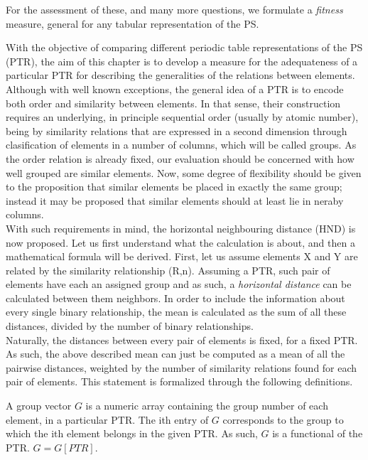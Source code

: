 \documentclass[article]{article}
\begin{document}
For the assessment of these, and many more questions, we formulate a \textit{fitness} measure, general for any tabular representation of the PS.



With the objective of comparing different periodic table representations of the PS (PTR), the aim of this chapter is to develop a measure for the adequateness of a particular PTR for describing the generalities of the relations between elements. \\

Although with well known exceptions, the general idea of a PTR is to encode both order and similarity between elements. In that sense, their construction requires an underlying, in principle sequential order (usually by atomic number), being  by similarity relations that are expressed in a second dimension through clasification of elements in a number of columns, which will be called groups. As the order relation is already fixed, our evaluation should be concerned with how well grouped are similar elements. Now, some degree of flexibility should be given to the proposition that similar elements be placed in exactly the same group; instead it may be proposed that similar elements should at least lie in neraby columns.\\

With such requirements in mind, the horizontal neighbouring distance (HND) is now proposed. Let us first understand what the calculation is about, and then a mathematical formula will be derived. First, let us assume elements X and Y are related by the similarity relationship (R,n). Assuming a PTR, such pair of elements have each an assigned group and as such, a \textit{horizontal distance} can be calculated between them neighbors. In order to include the information about every single binary relationship, the mean is calculated as the sum of all these distances, divided by the number of binary relationships.\\

Naturally, the distances between every pair of elements is fixed, for a fixed PTR. As such, the above described mean can just be computed as a mean of all the pairwise distances, weighted by the number of similarity relations found for each pair of elements. This statement is formalized through the following definitions.

\begin{definition}
\label{def:def3}
A group vector $G$ is a numeric array containing the group number of each element, in a particular PTR. The ith entry of $G$ corresponds to the group to which the ith element belongs in the given PTR. As such, $G$ is a functional of the PTR. $G=G[PTR]$.
\end{definition}
\end{document}
